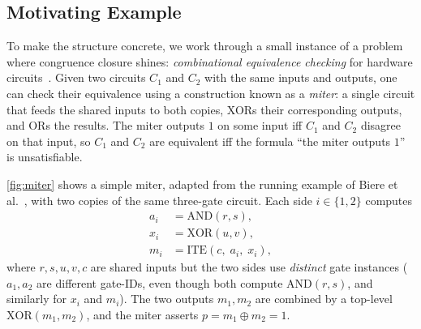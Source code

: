




\subsection{Motivating Example}
\label{sec:bg:motivating}

To make the structure concrete, we work through a small instance of a
problem where congruence closure shines: \emph{combinational equivalence
checking} for hardware circuits~\cite{clausal-cc}. Given two circuits
$C_1$ and $C_2$ with the same inputs and outputs, one can check their 
equivalence using a construction known as a \emph{miter}: a single
circuit that feeds the shared inputs to both copies, XORs their
corresponding outputs, and ORs the results. The miter outputs $1$ on some
input iff $C_1$ and $C_2$ disagree on that input, so $C_1$ and $C_2$ are
equivalent iff the formula ``the miter outputs $1$'' is unsatisfiable.

\autoref{fig:miter} shows a simple miter, adapted from the running
example of Biere et al.~\cite{clausal-cc}, with two copies of the same
three-gate circuit. Each side $i \in \{1, 2\}$ computes
%
\begin{equation*}\label{ex:formula}
\begin{aligned}
a_i &= \mathrm{AND}(r, s), \\
x_i &= \mathrm{XOR}(u, v), \\
m_i &= \mathrm{ITE}(c,\; a_i,\; x_i),
\end{aligned}
\end{equation*}
%
where $r, s, u, v, c$ are shared inputs but the two sides use
\emph{distinct} gate instances ($a_1, a_2$ are different gate-IDs, even
though both compute $\mathrm{AND}(r,s)$, and similarly for $x_i$ and
$m_i$). The two outputs $m_1, m_2$ are combined by a top-level
$\mathrm{XOR}(m_1, m_2)$, and the miter asserts $p = m_1 \oplus m_2 = 1$.

